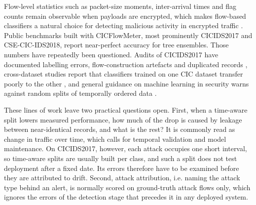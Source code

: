 \documentclass[conference]{IEEEtran}
\begin{document}
Flow-level statistics such as packet-size moments, inter-arrival times and flag counts remain observable when payloads are encrypted, which makes flow-based classifiers a natural choice for detecting malicious activity in encrypted traffic \cite{anderson2016,anderson2017,drapergil2016}. Public benchmarks built with CICFlowMeter, most prominently CICIDS2017 \cite{sharafaldin2018} and CSE-CIC-IDS2018, report near-perfect accuracy for tree ensembles. Those numbers have repeatedly been questioned. Audits of CICIDS2017 have documented labelling errors, flow-construction artefacts and duplicated records \cite{engelen2021,liu2022,lanvin2023,rosay2022}, cross-dataset studies report that classifiers trained on one CIC dataset transfer poorly to the other \cite{cantone2024}, and general guidance on machine learning in security warns against random splits of temporally ordered data \cite{arp2022,pendlebury2019,sommer2010,kaufman2012}.

These lines of work leave two practical questions open. First, when a time-aware split lowers measured performance, how much of the drop is caused by leakage between near-identical records, and what is the rest? It is commonly read as change in traffic over time, which calls for temporal validation and model maintenance. On CICIDS2017, however, each attack occupies one short interval, so time-aware splits are usually built per class, and such a split does not test deployment after a fixed date. Its errors therefore have to be examined before they are attributed to drift. Second, attack attribution, i.e. naming the attack type behind an alert, is normally scored on ground-truth attack flows only, which ignores the errors of the detection stage that precedes it in any deployed system.
\end{document}
